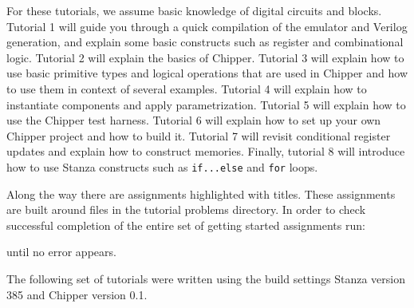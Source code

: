 For these tutorials, we assume basic knowledge of digital circuits and blocks. 
Tutorial 1 will guide you through a quick compilation of the emulator and Verilog generation, and explain some basic constructs such as register and combinational logic.
Tutorial 2 will explain the basics of Chipper.
Tutorial 3 will explain how to use basic primitive types and logical operations that are used in Chipper and how to use them in context of several examples. 
Tutorial 4 will explain how to instantiate components and apply parametrization. 
Tutorial 5 will explain how to use the Chipper test harness. 
Tutorial 6 will explain how to set up your own Chipper project and how to build it.
Tutorial 7 will revisit conditional register updates and explain how to construct memories.
Finally, tutorial 8 will introduce how to use Stanza constructs such as \verb+if...else+ and \verb+for+ loops.

Along the way there are assignments highlighted with  titles.  
These assignments are built around files in the tutorial problems directory.
In order to check successful completion of the entire set of getting started assignments run:

\noindent
until no error appears.

The following set of tutorials were written using the build settings Stanza version 385 and Chipper version 0.1.
